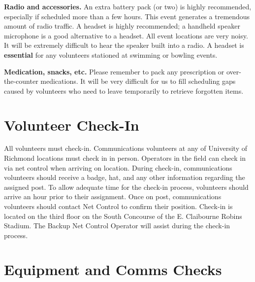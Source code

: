 \documentclass[pdflatex,letterpaper,twoside,12pt]{book}
\begin{document}
\textbf{Radio and accessories.}  An extra battery pack (or two) is highly recommended, especially if scheduled more than a few hours.  This event generates a tremendous amount of radio traffic.  A headset is highly recommended;  a handheld speaker microphone is a good alternative to a headset.  All event locations are very noisy.  It will be extremely difficult to hear the speaker built into a radio.  A headset is \textbf{essential} for any volunteers stationed at swimming or bowling events.

\textbf{Medication, snacks, etc.}  Please remember to pack any prescription or over-the-counter medications.  It will be very difficult for us to fill scheduling gaps caused by volunteers who need to leave temporarily to retrieve forgotten items.


\section{Volunteer Check-In}

All volunteers must check-in.  Communications volunteers at any of University of Richmond locations must check in in person.  Operators in the field can check in via net control when arriving on location.  During check-in, communications volunteers should receive a badge, hat, and any other information regarding the assigned post.  To allow adequate time for the check-in process, volunteers should arrive an hour prior to their assignment.  Once on post, communications volunteers should contact Net Control to confirm their position.  Check-in is located on the third floor on the South Concourse of the E. Claibourne Robins Stadium.  The Backup Net Control Operator will assist during the check-in process.


\section{Equipment and Comms Checks}

\end{document}
